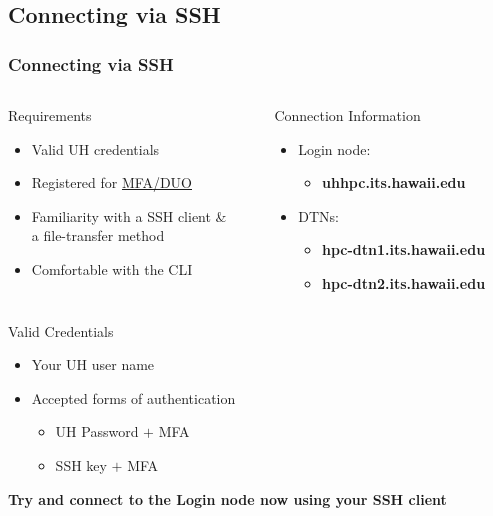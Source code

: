 \subsection[Connecting via SSH]{Connecting via SSH}
\begin{frame}
\frametitle{Connecting via SSH}
\begin{columns}
	\begin{column}{0.46\textwidth}
		\begin{block}{Requirements}
			\begin{itemize}
				\item Valid UH credentials 
				\item Registered for \href{http://www.hawaii.edu/its/uhlogin/}{MFA/DUO}
				\item Familiarity with a SSH client \&\\a file-transfer method
				\item Comfortable with the CLI
			\end{itemize}
                        \end{block}
	\end{column}
	\begin{column}{0.46\textwidth}
		\begin{block}{Connection Information}\
	\begin{itemize}
		\item Login node: 
		  \begin{itemize} 
		  \item \textbf{uhhpc.its.hawaii.edu}
		  \end{itemize}
		\item DTNs:
		  \begin{itemize} 
		  \item \textbf{hpc-dtn1.its.hawaii.edu}
		  \item \textbf{hpc-dtn2.its.hawaii.edu}
		  \end{itemize}
	\end{itemize}
        \end{block}
	        \end{column}                
	\end{columns}
	\begin{block}{Valid Credentials}\footnotesize
		\begin{itemize}
			\item Your UH user name
			\item Accepted forms of authentication
			\begin{itemize}\scriptsize
				\item UH Password $+$ MFA 
				\item SSH key $+$ MFA
			\end{itemize}
		\end{itemize}
	\end{block}
	\begin{center}\scriptsize
	\textbf{\large Try and connect to the {\mana} Login node now using your SSH client}
	\end{center}
\end{frame}

